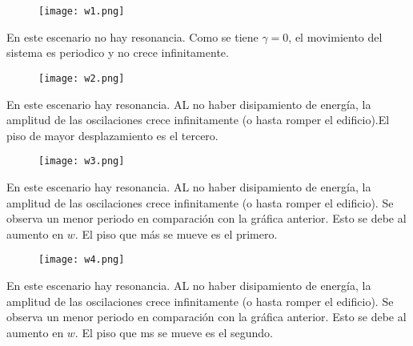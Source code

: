 \documentclass[11pt]{report}
\begin{document}
\begin{figure}[h]
\begin{center}
\texttt{[image: w1.png]}
\end{center}
\label{fig:uno}
\end{figure}

En este escenario no hay resonancia. Como se tiene $\gamma = 0$, el movimiento del sistema es periodico y no crece infinitamente.
\newpage

\begin{figure}[h]
\begin{center}
\texttt{[image: w2.png]}
\end{center}
\label{fig:uno}
\end{figure}

En este escenario hay resonancia. AL no haber disipamiento de energ\'ia, la amplitud de las oscilaciones crece infinitamente (o hasta romper el edificio).El piso de mayor desplazamiento es el tercero.


\newpage
\begin{figure}[h]
\begin{center}
\texttt{[image: w3.png]}
\end{center}
\label{fig:uno}
\end{figure}

En este escenario hay resonancia. AL no haber disipamiento de energ\'ia, la amplitud de las oscilaciones crece infinitamente (o hasta romper el edificio). Se observa un menor periodo en comparaci\'on con la gr\'afica anterior. Esto se debe al aumento en $w$. El piso que m\'as se mueve es el primero.

\newpage
\begin{figure}[h]
\begin{center}
\texttt{[image: w4.png]}
\end{center}
\label{fig:uno}
\end{figure}

En este escenario hay resonancia. AL no haber disipamiento de energ\'ia, la amplitud de las oscilaciones crece infinitamente (o hasta romper el edificio). Se observa un menor periodo en comparaci\'on con la gr\'afica anterior. Esto se debe al aumento en $w$. El piso que ms se mueve es el segundo.
\end{document}
